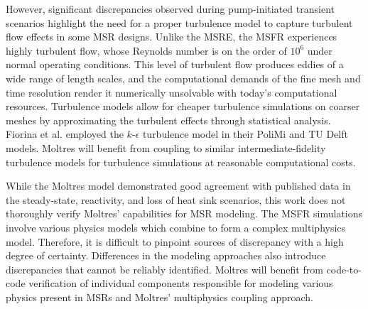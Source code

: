 However, significant discrepancies observed during pump-initiated transient
scenarios highlight the need for a proper turbulence model to capture
turbulent flow effects in some \gls{MSR} designs. Unlike the \gls{MSRE}, the
\gls{MSFR} experiences highly turbulent flow, whose Reynolds number is on the
order of $10^6$ under normal operating conditions. This level of turbulent flow
produces eddies of a wide range of length scales, and the computational demands
of the fine mesh and time resolution render it numerically unsolvable with
today's computational resources. Turbulence models allow for cheaper turbulence
simulations on coarser meshes by approximating the turbulent effects through
statistical analysis. Fiorina et al. \cite{fiorina_modelling_2014} employed the
$k$-$\epsilon$ turbulence model in their PoliMi and TU Delft models. Moltres
will benefit from coupling to similar intermediate-fidelity turbulence models
for turbulence simulations at reasonable computational costs.

While the Moltres model demonstrated good agreement with published data in the
steady-state, reactivity, and loss of heat sink scenarios, this work does not
thoroughly verify Moltres' capabilities for \gls{MSR} modeling.
The \gls{MSFR} simulations involve various physics models which combine to form
a complex multiphysics model. Therefore, it is difficult to pinpoint sources of
discrepancy with a high degree of certainty. Differences in the modeling
approaches also introduce discrepancies that cannot be reliably identified.
Moltres will benefit from code-to-code verification of
individual components responsible for modeling various physics present in
\glspl{MSR} and Moltres' multiphysics coupling approach.
